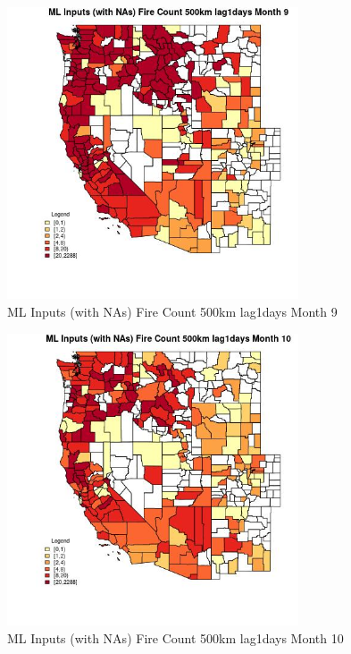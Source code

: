 \begin{figure} 
\centering  
\includegraphics[width=0.77\textwidth]{Code_Outputs/Report_ML_input_PM25_Step4_part_e_de_duplicated_aves_compiled_2019-05-20wNAs_CountyFire_Count_500km_lag1daysmedianMonth9.jpg} 
\caption{\label{fig:Report_ML_input_PM25_Step4_part_e_de_duplicated_aves_compiled_2019-05-20wNAsCountyFire_Count_500km_lag1daysmedianMonth9}ML Inputs (with NAs) Fire Count 500km lag1days Month 9} 
\end{figure} 
 

\begin{figure} 
\centering  
\includegraphics[width=0.77\textwidth]{Code_Outputs/Report_ML_input_PM25_Step4_part_e_de_duplicated_aves_compiled_2019-05-20wNAs_CountyFire_Count_500km_lag1daysmedianMonth10.jpg} 
\caption{\label{fig:Report_ML_input_PM25_Step4_part_e_de_duplicated_aves_compiled_2019-05-20wNAsCountyFire_Count_500km_lag1daysmedianMonth10}ML Inputs (with NAs) Fire Count 500km lag1days Month 10} 
\end{figure} 
 


